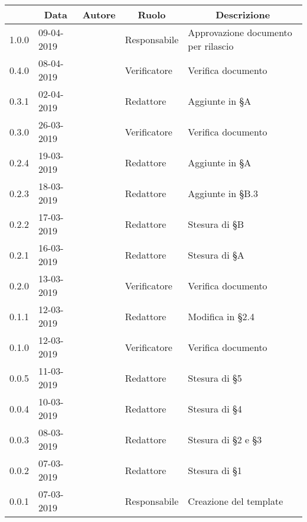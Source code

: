 \pagestyle{styleDocPages}

\begin{center} \sloppy
	\renewcommand{\arraystretch}{2.5}
	
	\begin{longtable}[H]{p{1.7cm} p{2cm} p{1.8cm} p{2.5cm} p{4cm}}
\rowcolor[HTML]{232f3e}
\multicolumn{1}{c}{\color[HTML]{FFFFFF} \textbf{Versione}} & 
\multicolumn{1}{c}{\color[HTML]{FFFFFF} \textbf{Data}} & 
\multicolumn{1}{c}{\color[HTML]{FFFFFF} \textbf{Autore}} & 
\multicolumn{1}{c}{\color[HTML]{FFFFFF} \textbf{Ruolo}} & 
\multicolumn{1}{c}{\color[HTML]{FFFFFF} \textbf{Descrizione}} \\
\endhead

1.0.0 & 09-04-2019 & \valentin{} & Responsabile & Approvazione documento per rilascio\\
0.4.0 & 08-04-2019 & \davide{} & Verificatore & Verifica documento\\
0.3.1 & 02-04-2019 & \francesco{} & Redattore & Aggiunte in §A\\
0.3.0 & 26-03-2019 & \davide{} & Verificatore & Verifica documento\\
0.2.4 & 19-03-2019 & \francesco{} & Redattore & Aggiunte in §A\\
0.2.3 & 18-03-2019 & \daniele{} & Redattore & Aggiunte in §B.3\\
0.2.2 & 17-03-2019 & \daniele{} & Redattore & Stesura di §B\\
0.2.1 & 16-03-2019 & \daniele{} & Redattore & Stesura di §A\\
0.2.0 & 13-03-2019 & \singh{} & Verificatore & Verifica documento\\
0.1.1 & 12-03-2019 & \valentin{} & Redattore & Modifica in §2.4\\
0.1.0 & 12-03-2019 & \singh{} & Verificatore & Verifica documento\\
0.0.5 & 11-03-2019 & \daniele{} & Redattore & Stesura di §5\\
0.0.4 & 10-03-2019 & \daniele{} & Redattore & Stesura di §4\\
0.0.3 & 08-03-2019 & \francesco{} & Redattore & Stesura di §2 e §3\\
0.0.2 & 07-03-2019 & \valentin{} & Redattore & Stesura di §1\\
0.0.1 & 07-03-2019 & \valentin{} & Responsabile & Creazione del template\\

\end{longtable}
\end{center}
